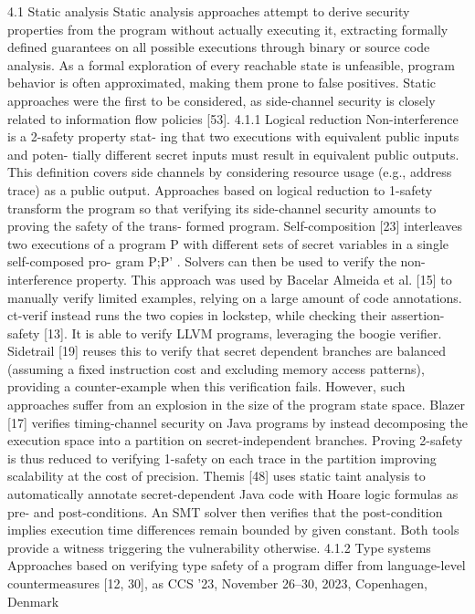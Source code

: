 4.1
Static analysis
Static analysis approaches attempt to derive security properties
from the program without actually executing it, extracting formally
defined guarantees on all possible executions through binary or
source code analysis. As a formal exploration of every reachable
state is unfeasible, program behavior is often approximated, making
them prone to false positives. Static approaches were the first to be
considered, as side-channel security is closely related to information
flow policies [53].
4.1.1 Logical reduction Non-interference is a 2-safety property stat-
ing that two executions with equivalent public inputs and poten-
tially different secret inputs must result in equivalent public outputs.
This definition covers side channels by considering resource usage
(e.g., address trace) as a public output. Approaches based on logical
reduction to 1-safety transform the program so that verifying its
side-channel security amounts to proving the safety of the trans-
formed program.
Self-composition [23] interleaves two executions of a program P
with different sets of secret variables in a single self-composed pro-
gram P;P' . Solvers can then be used to verify the non-interference
property. This approach was used by Bacelar Almeida et al. [15]
to manually verify limited examples, relying on a large amount of
code annotations. ct-verif instead runs the two copies in lockstep,
while checking their assertion-safety [13]. It is able to verify LLVM
programs, leveraging the boogie verifier. Sidetrail [19] reuses this
to verify that secret dependent branches are balanced (assuming
a fixed instruction cost and excluding memory access patterns),
providing a counter-example when this verification fails.
However, such approaches suffer from an explosion in the size of
the program state space. Blazer [17] verifies timing-channel security
on Java programs by instead decomposing the execution space into
a partition on secret-independent branches. Proving 2-safety is
thus reduced to verifying 1-safety on each trace in the partition
improving scalability at the cost of precision. Themis [48] uses static
taint analysis to automatically annotate secret-dependent Java code
with Hoare logic formulas as pre- and post-conditions. An SMT
solver then verifies that the post-condition implies execution time
differences remain bounded by given constant. Both tools provide
a witness triggering the vulnerability otherwise.
4.1.2 Type systems Approaches based on verifying type safety of
a program differ from language-level countermeasures [12, 30], as
CCS ’23, November 26–30, 2023, Copenhagen, Denmark
